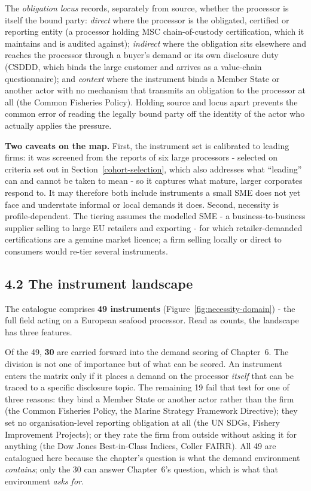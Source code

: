 The \emph{obligation locus} records, separately from source, whether the
processor is itself the bound party: \emph{direct} where the processor is the
obligated, certified or reporting entity (a processor holding MSC
chain-of-custody certification, which it maintains and is audited against);
\emph{indirect} where the obligation sits elsewhere and reaches the processor
through a buyer's demand or its own disclosure duty (CSDDD, which binds the large
customer and arrives as a value-chain questionnaire); and \emph{context} where
the instrument binds a Member State or another actor with no mechanism that
transmits an obligation to the processor at all (the Common Fisheries Policy).
Holding source and locus apart prevents the common error of reading the legally
bound party off the identity of the actor who actually applies the pressure.

\textbf{Two caveats on the map.} First, the instrument set is calibrated to
leading firms: it was screened from the reports of six large processors -
selected on criteria set out in Section~\ref{cohort-selection}, which also
addresses what ``leading'' can and cannot be taken to mean - so it
captures what mature, larger corporates respond to. It may therefore both
include instruments a small SME does not yet face and understate informal or
local demands it does. Second, necessity is profile-dependent. The tiering
assumes the modelled SME - a business-to-business supplier selling to large EU
retailers and exporting - for which retailer-demanded certifications are a genuine
market licence; a firm selling locally or direct to consumers would re-tier
several instruments.

\subsection{4.2 The instrument landscape}\label{ecosystem-landscape}

The catalogue comprises \textbf{49 instruments}
(Figure~\ref{fig:necessity-domain}) - the full field acting on a European
seafood processor. Read as counts, the landscape has three features.

Of the 49, \textbf{30} are carried forward into the demand scoring of
Chapter~6. The division is not one of importance but of what can be scored. An
instrument enters the matrix only if it places a demand on the processor
\emph{itself} that can be traced to a specific disclosure topic. The remaining
19 fail that test for one of three reasons: they bind a Member State or another
actor rather than the firm (the Common Fisheries Policy, the Marine Strategy
Framework Directive); they set no organisation-level reporting obligation at all
(the UN SDGs, Fishery Improvement Projects); or they rate the firm from outside
without asking it for anything (the Dow Jones Best-in-Class Indices, Coller
FAIRR). All 49 are catalogued here because the chapter's question is what the
demand environment \emph{contains}; only the 30 can answer Chapter~6's question,
which is what that environment \emph{asks for}.


